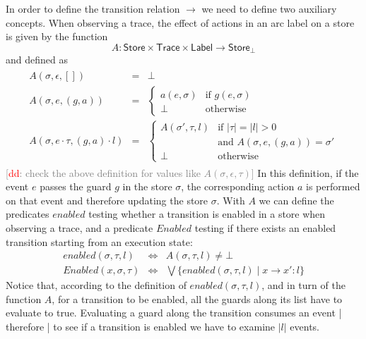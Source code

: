 \documentclass{sigplanconf}[10pt] %
\newcommand{\noterg}[2]{\textcolor{gray}{[\textcolor{red}{#1}: #2]}}
\newcommand{\dd}[1]{\noterg{dd}{#1}}
\newcommand{\dinocomment}[1]{\dd{#1}}
\newcommand{\set}[1]{\ensuremath{\mathsf{#1}}}
\begin{document}
In order to define the transition relation $\to$ we need to define two auxiliary concepts.
When observing a trace, the effect of actions in an arc label on a store  is given by the function
\[
   A : \set{Store} \times \set{Trace} \times \set{Label} \to \set{Store}_\bot
\] and defined as
\[
\begin{array}{c}
\begin{array}{lcl}
A(\sigma,\epsilon,[]) & = & \bot
\\[2ex]
A(\sigma,e,(g,a)) & = & \left\{\begin{array}{ll}
     a(e,\sigma) & \mbox{if $g(e,\sigma)$}
     \\[1ex]
     \bot & \mbox{otherwise}
     \end{array}
     \right.
\\[5ex]
A(\sigma,e\cdot \tau,(g,a)\cdot l) & = & \left\{\begin{array}{ll}
     A(\sigma',\tau,l) & \mbox{if $|\tau|=|l|>0$}
     \\
& \mbox{and  $A(\sigma,e,(g,a))=\sigma'$}
     \\[1ex]
     \bot & \mbox{otherwise}
     \end{array}
     \right.
\end{array}
\end{array}\]
\dinocomment{check the above definition for values like $A(\sigma,\epsilon,\tau)$}
In this definition, if the event $e$ passes the guard $g$ in the store $\sigma$, the corresponding action $a$ is performed on that event and therefore updating the store $\sigma$.
With $A$ we can define the predicates $enabled$ testing whether a transition is enabled in a store when observing a trace, and a predicate $Enabled$ testing if there exists an enabled transition starting from an execution state:
\begin{eqnarray*}
enabled(\sigma,\tau,l) & \Leftrightarrow & A(\sigma,\tau,l) \neq \bot
\\
Enabled(x,\sigma,\tau) & \Leftrightarrow  & \bigvee \{ enabled(\sigma,\tau,l) \mid x \to x' : l \}
\end{eqnarray*}
Notice that, according to the definition of $enabled(\sigma,\tau,l)$, and in turn of the function $A$, for a transition to be enabled, all the guards along its list have to evaluate to true.
Evaluating a guard along the transition consumes an event |  therefore | to see if a transition is enabled we have to examine $|l|$ events.
\end{document}

